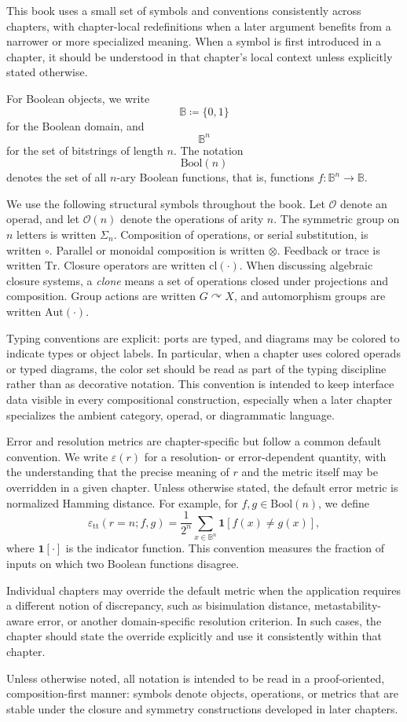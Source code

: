 This book uses a small set of symbols and conventions consistently across chapters, with chapter-local redefinitions when a later argument benefits from a narrower or more specialized meaning. When a symbol is first introduced in a chapter, it should be understood in that chapter's local context unless explicitly stated otherwise.

For Boolean objects, we write
\[
\mathbb{B} \coloneqq \{0,1\}
\]
for the Boolean domain, and
\[
\mathbb{B}^n
\]
for the set of bitstrings of length $n$. The notation
\[
\mathrm{Bool}(n)
\]
denotes the set of all $n$-ary Boolean functions, that is, functions $f : \mathbb{B}^n \to \mathbb{B}$.

We use the following structural symbols throughout the book. Let $\mathcal{O}$ denote an operad, and let $\mathcal{O}(n)$ denote the operations of arity $n$. The symmetric group on $n$ letters is written $\Sigma_n$. Composition of operations, or serial substitution, is written $\circ$. Parallel or monoidal composition is written $\otimes$. Feedback or trace is written $\mathrm{Tr}$. Closure operators are written $\mathrm{cl}(\cdot)$. When discussing algebraic closure systems, a \emph{clone} means a set of operations closed under projections and composition. Group actions are written $G \curvearrowright X$, and automorphism groups are written $\mathrm{Aut}(\cdot)$.

Typing conventions are explicit: ports are typed, and diagrams may be colored to indicate types or object labels. In particular, when a chapter uses colored operads or typed diagrams, the color set should be read as part of the typing discipline rather than as decorative notation. This convention is intended to keep interface data visible in every compositional construction, especially when a later chapter specializes the ambient category, operad, or diagrammatic language.

Error and resolution metrics are chapter-specific but follow a common default convention. We write $\varepsilon(r)$ for a resolution- or error-dependent quantity, with the understanding that the precise meaning of $r$ and the metric itself may be overridden in a given chapter. Unless otherwise stated, the default error metric is normalized Hamming distance. For example, for $f,g \in \mathrm{Bool}(n)$, we define
\[
\varepsilon_{\mathrm{tt}}(r=n; f,g) = \frac{1}{2^n} \sum_{x \in \mathbb{B}^n} \mathbf{1}[f(x) \neq g(x)] ,
\]
where $\mathbf{1}[\cdot]$ is the indicator function. This convention measures the fraction of inputs on which two Boolean functions disagree.

Individual chapters may override the default metric when the application requires a different notion of discrepancy, such as bisimulation distance, metastability-aware error, or another domain-specific resolution criterion. In such cases, the chapter should state the override explicitly and use it consistently within that chapter.

Unless otherwise noted, all notation is intended to be read in a proof-oriented, composition-first manner: symbols denote objects, operations, or metrics that are stable under the closure and symmetry constructions developed in later chapters.
